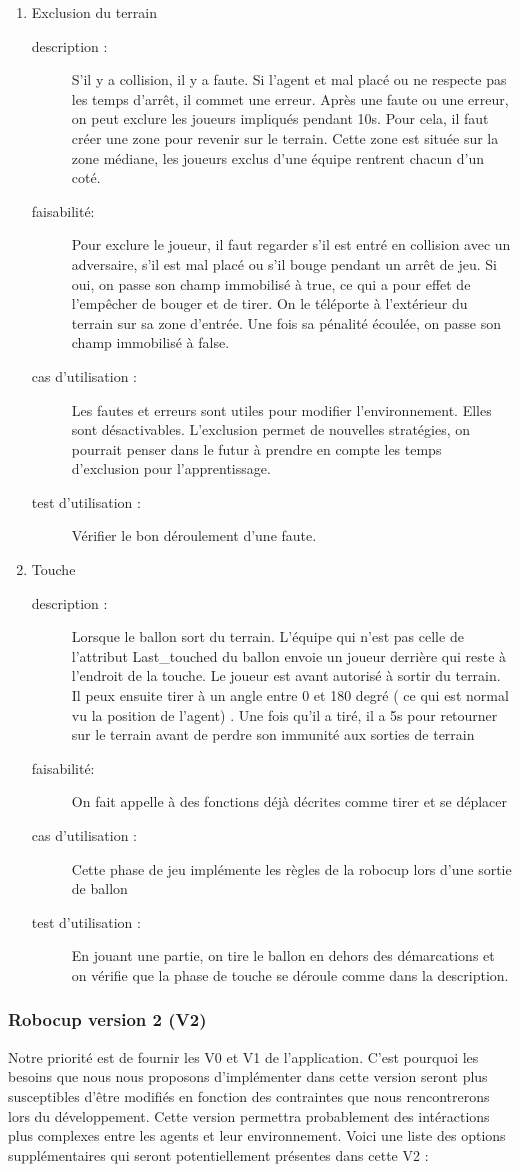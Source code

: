 \documentclass[11pt, a4paper]{article}
\newcommand{\besoinVItem}[5]{
	\item #1
	\begin{description}
		\item[description :]
		#2 
		\item[faisabilité: ]
		#3
		\item[cas d'utilisation :]
		#4
		\item[test d'utilisation :]      
		#5
	\end{description}
}
\begin{document}
\begin{enumerate}
	\besoinVItem{Exclusion du terrain}
	{S'il y a collision, il y a faute. Si l'agent et mal placé ou ne respecte pas les temps d'arrêt, il commet une erreur. Après une faute ou une erreur, on peut exclure les joueurs impliqués pendant 10s. Pour cela, il faut créer une zone pour revenir sur le terrain. Cette zone est située sur la zone médiane, les joueurs exclus d'une équipe rentrent chacun d'un coté.
	 }
	{Pour exclure le joueur, il faut regarder s'il est entré en collision avec un adversaire, s'il est mal placé ou s'il bouge pendant un arrêt de jeu. Si oui, on passe son champ immobilisé à true, ce qui a pour effet de l'empêcher de bouger et de tirer. On le téléporte à l'extérieur du terrain sur sa zone d'entrée. Une fois sa pénalité écoulée, on passe son champ immobilisé à false.\\}
	{Les fautes et erreurs sont utiles pour modifier l'environnement. Elles sont désactivables. L'exclusion permet de nouvelles stratégies, on pourrait penser dans le futur à prendre en compte les temps d'exclusion pour l'apprentissage.}
	{Vérifier le bon déroulement d'une faute.}
	
	\besoinVItem{Touche}
	{Lorsque le ballon sort du terrain. L’équipe qui n’est pas celle de l’attribut Last\_touched du ballon envoie un joueur derrière qui reste à l’endroit de la touche. Le joueur est avant autorisé à sortir du terrain. Il peux ensuite tirer à un angle entre 0 et 180 degré ( ce qui est normal vu la position de l’agent) . Une fois qu’il a tiré, il a 5s pour retourner sur le terrain avant de perdre son immunité aux sorties de terrain   }
	{On fait appelle à des fonctions déjà décrites comme tirer et se déplacer}
	{Cette phase de jeu implémente les règles de la robocup lors d’une sortie de ballon}
	{En jouant une partie, on tire le ballon en dehors des démarcations et on vérifie que la phase de touche se déroule comme dans la description.}

\end{enumerate}

\subsubsection{Robocup version 2 (V2)}
	Notre priorité est de fournir les V0 et V1 de l'application. C'est pourquoi les besoins que nous nous proposons d'implémenter dans cette version seront plus susceptibles d'être modifiés en fonction des contraintes que nous rencontrerons lors du développement.
	Cette version permettra probablement des intéractions plus complexes entre les agents et leur environnement. 
	Voici une liste des options supplémentaires qui seront potentiellement présentes dans cette V2 :
\end{document}
